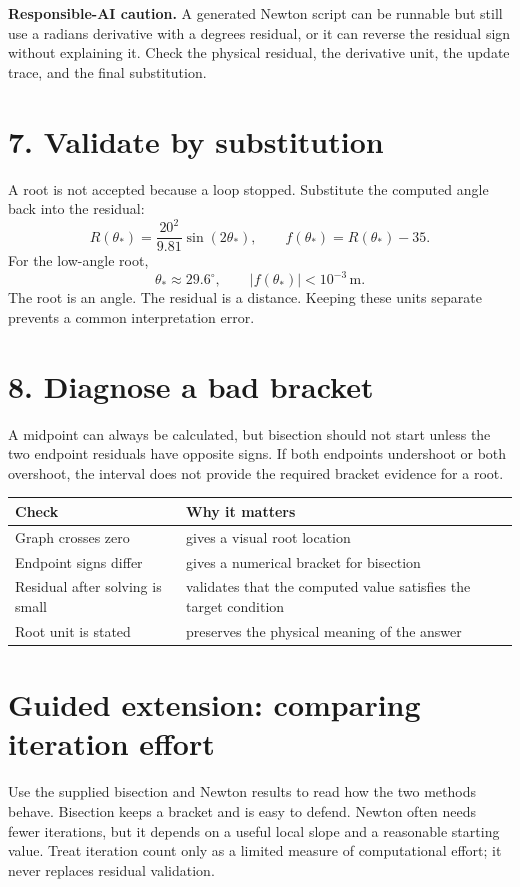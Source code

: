\documentclass[11pt,a4paper]{article}
\newcommand{\units}[1]{\,\mathrm{#1}}
\begin{document}
\begin{aibox}\textbf{Responsible-AI caution.} A generated Newton script can be runnable but still use a radians derivative with a degrees residual, or it can reverse the residual sign without explaining it. Check the physical residual, the derivative unit, the update trace, and the final substitution.\end{aibox}

\section*{7. Validate by substitution}
A root is not accepted because a loop stopped. Substitute the computed angle back into the residual:
\[
R(\theta_*)=\frac{20^2}{9.81}\sin(2\theta_*),\qquad f(\theta_*)=R(\theta_*)-35.
\]
For the low-angle root,
\[
\theta_*\approx 29.6^\circ,\qquad |f(\theta_*)|<10^{-3}\units{m}.
\]
The root is an angle. The residual is a distance. Keeping these units separate prevents a common interpretation error.

\section*{8. Diagnose a bad bracket}
A midpoint can always be calculated, but bisection should not start unless the two endpoint residuals have opposite signs. If both endpoints undershoot or both overshoot, the interval does not provide the required bracket evidence for a root.

\begin{center}\small
\begin{tabular}{>{\raggedright\arraybackslash}p{.25\linewidth}>{\raggedright\arraybackslash}p{.48\linewidth}}
\toprule
\textbf{Check} & \textbf{Why it matters}\\
\midrule
Graph crosses zero & gives a visual root location\\
Endpoint signs differ & gives a numerical bracket for bisection\\
Residual after solving is small & validates that the computed value satisfies the target condition\\
Root unit is stated & preserves the physical meaning of the answer\\
\bottomrule
\end{tabular}
\end{center}

\section*{Guided extension: comparing iteration effort}
Use the supplied bisection and Newton results to read how the two methods behave. Bisection keeps a bracket and is easy to defend. Newton often needs fewer iterations, but it depends on a useful local slope and a reasonable starting value. Treat iteration count only as a limited measure of computational effort; it never replaces residual validation.
\end{document}
